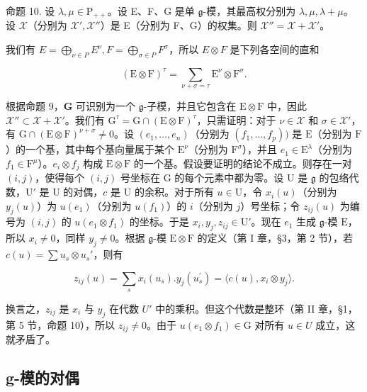 命题 10. 设 \(\lambda, \mu \in \mathrm{P}_{++}\)。设 E、F、G 是单 \(\mathfrak{g}\)-模，其最高权分别为 \(\lambda, \mu, \lambda + \mu\)。设 \(\mathcal{X}\)（分别为 \(\mathcal{X}', \mathcal{X}''\)）是 E（分别为 F、G）的权集。则 \(\mathcal{X}'' = \mathcal{X} + \mathcal{X}'\)。

我们有 \(E = \bigoplus_{\nu \in P} E^{\nu}, F = \bigoplus_{\sigma \in P} F^{\sigma}\)，所以 \(E \otimes F\) 是下列各空间的直和

\[
(\mathrm{E} \otimes \mathrm{F}) ^ {\tau} = \sum_ {\nu + \sigma = \tau} \mathrm{E} ^ {\nu} \otimes \mathrm{F} ^ {\sigma}.
\]

根据命题 9，\(\mathbf{G}\) 可识别为一个 \(\mathfrak{g}\)-子模，并且它包含在 \(\mathrm{E} \otimes \mathrm{F}\) 中，因此 \(\mathcal{X}'' \subset \mathcal{X} + \mathcal{X}'\)。我们有 \(\mathrm{G}^{\tau} = \mathrm{G} \cap (\mathrm{E} \otimes \mathrm{F})^{\tau}\)，只需证明：对于 \(\nu \in \mathcal{X}\) 和 \(\sigma \in \mathcal{X}'\)，有 \(\mathrm{G} \cap (\mathrm{E} \otimes \mathrm{F})^{\nu + \sigma} \neq 0\)。设 \((e_1, \ldots, e_n)\)（分别为 \((f_1, \ldots, f_p))\) 是 \(\mathrm{E}\)（分别为 \(\mathrm{F}\)）的一个基，其中每个基向量属于某个 \(\mathrm{E}^\nu\)（分别为 \(\mathrm{F}^\sigma\)），并且 \(e_1 \in \mathrm{E}^\lambda\)（分别为 \(f_1 \in \mathrm{F}^\mu\)）。\(e_i \otimes f_j\) 构成 \(\mathrm{E} \otimes \mathrm{F}\) 的一个基。假设要证明的结论不成立。则存在一对 \((i,j)\)，使得每个 \((i,j)\) 号坐标在 \(\mathrm{G}\) 的每个元素中都为零。设 \(\mathrm{U}\) 是 \(\mathfrak{g}\) 的包络代数，\(\mathrm{U}'\) 是 \(\mathrm{U}\) 的对偶，\(c\) 是 \(\mathrm{U}\) 的余积。对于所有 \(u \in \mathrm{U}\)，令 \(x_i(u)\)（分别为 \(y_j(u)\)）为 \(u(e_1)\)（分别为 \(u(f_1)\)）的 \(i\)（分别为 \(j\)）号坐标；令 \(z_{ij}(u)\) 为编号为 \((i,j)\) 的 \(u(e_1 \otimes f_1)\) 的坐标。于是 \(x_i, y_j, z_{ij} \in \mathrm{U}'\)。现在 \(e_1\) 生成 \(\mathfrak{g}\)-模 \(\mathrm{E}\)，所以 \(x_i \neq 0\)，同样 \(y_j \neq 0\)。根据 \(\mathfrak{g}\)-模 \(\mathrm{E} \otimes \mathrm{F}\) 的定义（第 I 章，§3，第 2 节），若 \(c(u) = \sum u_s \otimes u_s'\)，则有

\[
z _ {i j} (u) = \sum_ {s} x _ {i} (u _ {s}). y _ {j} (u _ {s} ^ {\prime}) = \langle c (u), x _ {i} \otimes y _ {j} \rangle .
\]

换言之，\(z_{ij}\) 是 \(x_{i}\) 与 \(y_{j}\) 在代数 \(U'\) 中的乘积。但这个代数是整环（第 II 章，§1，第 5 节，命题 10），所以 \(z_{ij} \neq 0\)。由于 \(u(e_{1} \otimes f_{1}) \in \mathrm{G}\) 对所有 \(u \in U\) 成立，这就矛盾了。

\subsection{g-模的对偶}

